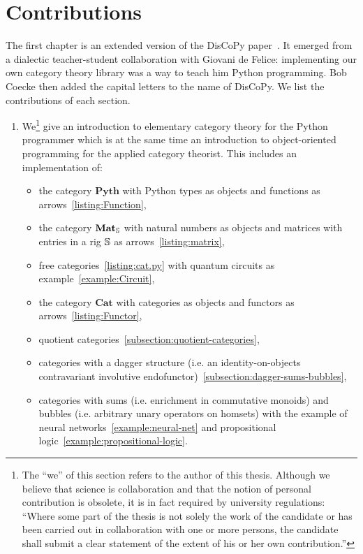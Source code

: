 
\section*{Contributions}

The first chapter is an extended version of the DisCoPy paper~\cite{FeliceEtAl20a}.
It emerged from a dialectic teacher-student collaboration with Giovani de Felice: implementing our own category theory library was a way to teach him Python programming.
Bob Coecke then added the capital letters to the name of DisCoPy.
We list the contributions of each section.

\begin{enumerate}
\item We\footnote
{The ``we'' of this section refers to the author of this thesis.
Although we believe that science is collaboration and that the notion of personal contribution is obsolete, it is in fact required by university regulations: ``Where some part of the thesis is not solely the work of the candidate or has been carried out in collaboration with one or more persons, the candidate shall submit a clear statement of the extent of his or her own contribution.''}
give an introduction to elementary category theory for the Python programmer which is at the same time an introduction to object-oriented programming for the applied category theorist.
This includes an implementation of:
\begin{itemize}
    \item the category $\mathbf{Pyth}$ with Python types as objects and functions as arrows~\ref{listing:Function},
    \item the category $\mathbf{Mat}_\S$ with natural numbers as objects and matrices with entries in a rig $\S$ as arrows~\ref{listing:matrix},
    \item free categories~\ref{listing:cat.py} with quantum circuits as example~\ref{example:Circuit},
    \item the category $\mathbf{Cat}$ with categories as objects and functors as arrows~\ref{listing:Functor},
    \item quotient categories~\ref{subsection:quotient-categories},
    \item categories with a dagger structure (i.e. an identity-on-objects contravariant involutive endofunctor)~\ref{subsection:dagger-sums-bubbles},
    \item categories with sums (i.e. enrichment in commutative monoids) and bubbles (i.e. arbitrary unary operators on homsets) with the example of neural networks~\ref{example:neural-net} and propositional logic~\ref{example:propositional-logic}.
\end{itemize}


\end{enumerate}
